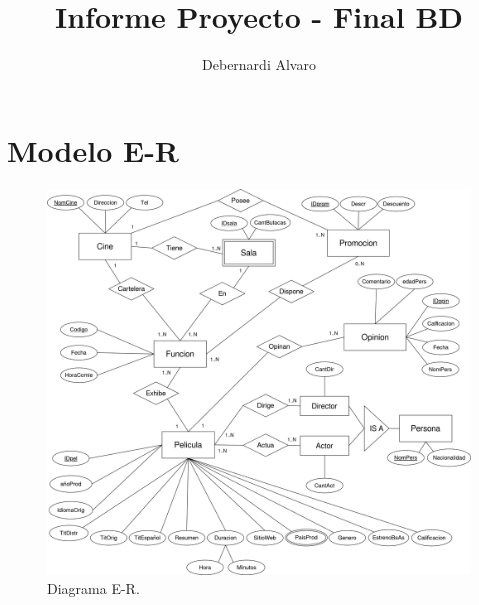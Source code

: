 \documentclass{article}
\title{Informe Proyecto - Final BD}
\author{Debernardi Alvaro}
\date{}
\begin{document}
\maketitle

\section{Modelo E-R}

  \begin{figure}[h]
    \centering
    \includegraphics[scale=0.2]{Diagramm.png}
    \caption{Diagrama E-R.}
  \end{figure}
\end{document}

